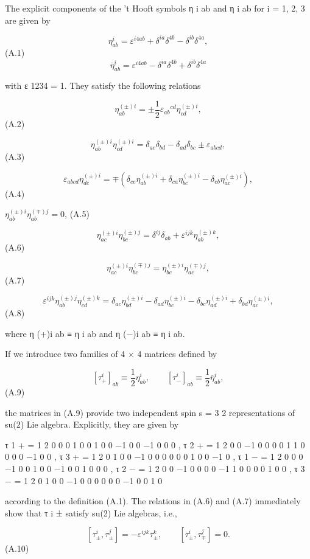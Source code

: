 \documentclass{article}
\begin{document}
The explicit components of the 't Hooft symbols η i ab and η i ab for i = 1, 2, 3 are given by

$$\eta^{i}_{ab}=\varepsilon^{i4ab}+\delta^{ia}\delta^{4b}-\delta^{ib}\delta^{4a},$$ (A.1) $$\overline{\eta}^{i}_{ab}=\varepsilon^{i4ab}-\delta^{ia}\delta^{4b}+\delta^{ib}\delta^{4a}$$

with ε 1234 = 1. They satisfy the following relations

$$\eta^{(\pm)i}_{ab}=\pm\frac{1}{2}\varepsilon_{ab}{}^{cd}\eta^{(\pm)i}_{cd},$$ (A.2)

$$\eta^{(\pm)i}_{ab}\eta^{(\pm)i}_{cd}=\delta_{ac}\delta_{bd}-\delta_{ad}\delta_{bc}\pm\varepsilon_{abcd},$$ (A.3)

$$\varepsilon_{abcd}\eta^{(\pm)i}_{de}=\mp(\delta_{ce}\eta^{(\pm)i}_{ab}+\delta_{ca}\eta^{(\pm)i}_{bc}-\delta_{eb}\eta^{(\pm)i}_{ac}),$$ (A.4)

$\eta^{(\pm)i}_{ab}\eta^{(\mp)j}_{ab}=0$, (A.5)

$$\eta^{(\pm)i}_{ac}\eta^{(\pm)j}_{bc}=\delta^{ij}\delta_{ab}+\varepsilon^{ijk}\eta^{(\pm)k}_{ab},$$ (A.6)

$$\eta^{(\pm)i}_{ac}\eta^{(\mp)j}_{bc}=\eta^{(\pm)i}_{bc}\eta^{(\mp)j}_{ac},$$ (A.7)

$$\varepsilon^{ijk}\eta^{(\pm)j}_{ab}\eta^{(\pm)k}_{cd}=\delta_{ac}\eta^{(\pm)i}_{bd}-\delta_{ad}\eta^{(\pm)i}_{bc}-\delta_{bc}\eta^{(\pm)i}_{ad}+\delta_{bd}\eta^{(\pm)i}_{ac},$$ (A.8)

where η (+)i ab ≡ η i ab and η (−)i ab ≡ η i ab.

If we introduce two families of 4 × 4 matrices defined by

$$[\tau_{+}^{i}]_{ab}\equiv\frac{1}{2}\eta_{ab}^{i},\qquad[\tau_{-}^{i}]_{ab}\equiv\frac{1}{2}\overline{\eta}_{ab}^{i},$$ (A.9)

the matrices in (A.9) provide two independent spin s = 3 2 representations of su(2) Lie algebra. Explicitly, they are given by

τ 1 + = 1 2 0 0 0 1 0 0 1 0 0 −1 0 0 −1 0 0 0 , τ 2 + = 1 2 0 0 −1 0 0 0 0 1 1 0 0 0 0 −1 0 0 , τ 3 + = 1 2 0 1 0 0 −1 0 0 0 0 0 0 1 0 0 −1 0 , τ 1 − = 1 2 0 0 0 −1 0 0 1 0 0 −1 0 0 1 0 0 0 , τ 2 − = 1 2 0 0 −1 0 0 0 0 −1 1 0 0 0 0 1 0 0 , τ 3 − = 1 2 0 1 0 0 −1 0 0 0 0 0 0 −1 0 0 1 0

according to the definition (A.1). The relations in (A.6) and (A.7) immediately show that τ i ± satisfy su(2) Lie algebras, i.e.,

$$[\tau^{i}_{\pm},\tau^{j}_{\pm}]=-\varepsilon^{ijk}\tau^{k}_{\pm},\qquad[\tau^{i}_{\pm},\tau^{j}_{\mp}]=0.$$ (A.10)
\end{document}
